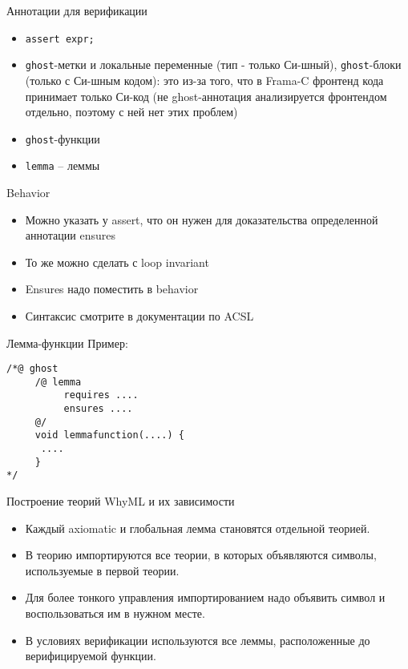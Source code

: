 \documentclass[hyperref={unicode=true}]{beamer}
\begin{document}
    \begin{frame}{Аннотации для верификации}
    \begin{itemize}
    \item
    \texttt{assert expr;}
    \item
    \texttt{ghost}-метки и локальные переменные (тип - только Си-шный),
    \texttt{ghost}-блоки (только с Си-шным кодом): это из-за того, что
    в Frama-C фронтенд кода принимает только Си-код (не ghost-аннотация
    анализируется фронтендом отдельно, поэтому с ней нет этих проблем)
    \item
    \texttt{ghost}-функции
    \item
    \texttt{lemma} -- леммы
    \end{itemize}
    \end{frame}

    \begin{frame}{Behavior}
    \begin{itemize}
    \item
    Можно указать у assert, что он нужен для доказательства
    определенной аннотации ensures
    \item
    То же можно сделать с loop invariant
    \item
    Ensures надо поместить в behavior
    \item
    Синтаксис смотрите в документации по ACSL
    \end{itemize}
    \end{frame}

    \begin{frame}[fragile]{Лемма-функции}
    Пример:

    \begin{lstlisting}
/*@ ghost
     /@ lemma
          requires ....
          ensures ....
     @/
     void lemmafunction(....) {
      ....
     }
*/
    \end{lstlisting}
    \end{frame}

    \begin{frame}{Построение теорий WhyML и их зависимости}
    \begin{itemize}
    \item
    Каждый axiomatic и глобальная лемма становятся
    отдельной теорией.
    \item
    В теорию импортируются все теории, в которых
    объявляются символы, используемые в первой теории.
    \item
    Для более тонкого управления импортированием
    надо объявить символ и воспользоваться им в нужном месте.
    \item
    В условиях верификации используются все леммы,
    расположенные до верифицируемой функции.
    \end{itemize}
    \end{frame}
\end{document}
